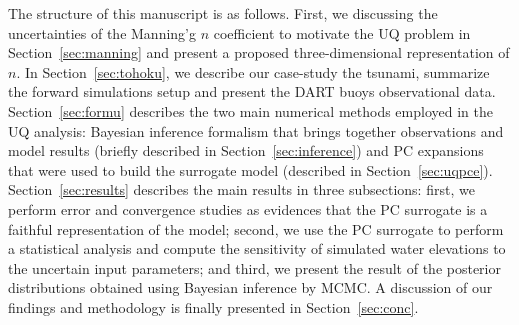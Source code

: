 The structure of this manuscript is as follows. First, we discussing the uncertainties 
of the Manning'g $n$ coefficient to motivate the UQ problem in Section~\ref{sec:manning}
and present a proposed three-dimensional representation of $n$. 
In Section~\ref{sec:tohoku}, we describe our case-study the \tohoku tsunami,
summarize the forward simulations setup and present the DART buoys observational data. 
Section~\ref{sec:formu} describes the two main numerical methods employed in the UQ analysis:
Bayesian inference formalism that brings together observations 
and model results (briefly described in Section~\ref{sec:inference}) 
and PC expansions that were used to build the surrogate model (described
in Section~\ref{sec:uqpce}). Section~\ref{sec:results} describes the main results in 
three subsections: first, we perform error and convergence studies
as evidences that the PC surrogate is a faithful 
representation of the \geoclaw model; second, we use the PC surrogate to 
perform a statistical analysis and compute the  sensitivity of simulated water elevations
to the uncertain input parameters; and third, we present the result of the
posterior distributions obtained using Bayesian inference by MCMC. A discussion of our findings and methodology is finally presented in Section~\ref{sec:conc}.